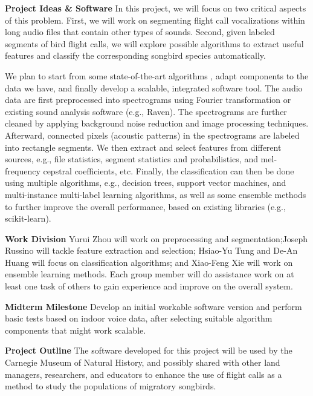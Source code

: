 \documentclass{article} %
\begin{document}
{\bf Project Ideas \& Software} In this project, we will focus on two critical aspects of this problem. First, we will work on segmenting flight call vocalizations within long audio files that contain other types of sounds. Second, given labeled segments of bird flight calls, we will explore possible algorithms to extract useful features and classify the corresponding songbird species automatically.


We plan to start from some state-of-the-art algorithms \cite{briggs2013instance,Lasseck13,Massaron13,stattnersong13}, adapt components to the data we have, and finally develop a scalable, integrated software tool.
The audio data are first preprocessed into spectrograms using Fourier transformation or existing sound analysis software (e.g., Raven). The spectrograms are further cleaned by applying background noise reduction and image processing techniques. Afterward, connected pixels (acoustic patterns) in the spectrograms are labeled into rectangle segments.  We then extract and select features from different sources, e.g., file statistics, segment statistics and probabilistics, and mel-frequency cepstral coefficients, etc. Finally, the classification can then be done using multiple algorithms, e.g., decision trees, support vector machines, and multi-instance multi-label learning algorithms, as well as some ensemble methods to further improve the overall performance, based on existing libraries (e.g., scikit-learn). %

{\bf Work Division} Yurui Zhou will work on preprocessing and segmentation;Joseph Russino will tackle feature extraction and selection; Hsiao-Yu Tung and De-An Huang will focus on classification algorithms; and Xiao-Feng Xie will work on ensemble learning methods. Each group member will do assistance work on at least one task of others to gain experience and improve on the overall system.  

{\bf Midterm Milestone} Develop an initial workable software version and perform basic tests based on indoor voice data, after selecting suitable algorithm components that might work scalable.

{\bf Project Outline} The software developed for this project will be used by the Carnegie Museum of Natural History, and possibly shared with other land managers, researchers, and educators to enhance the use of flight calls as a method to study the populations of migratory songbirds. %



\end{document}
